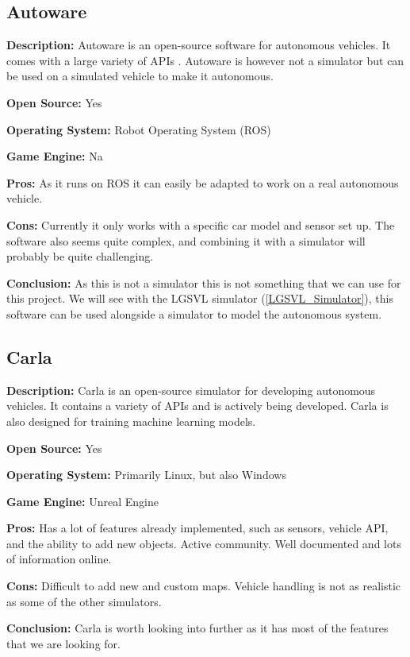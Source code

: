 \subsection{Autoware} \label{Autoware}
\textbf{Description:} Autoware is an open-source software for autonomous vehicles. It comes with a large variety of APIs  \cite{Autoware_doc_Website}. Autoware is however not a simulator but can be used on a simulated vehicle to make it autonomous.

\textbf{Open Source:} Yes

\textbf{Operating System:} Robot Operating System (ROS)

\textbf{Game Engine:} Na

\textbf{Pros:} As it runs on ROS it can easily be adapted to work on a real autonomous vehicle.

\textbf{Cons:} Currently it only works with a specific car model and sensor set up. The software also seems quite complex, and combining it with a simulator will probably be quite challenging.

\textbf{Conclusion:} As this is not a simulator this is not something that we can use for this project. We will see with the LGSVL simulator (\ref{LGSVL_Simulator}), this software can be used alongside a simulator to model the autonomous system. 


\subsection{Carla} \label{Carla}
\textbf{Description:} Carla is an open-source simulator for developing autonomous vehicles. It contains a variety of APIs and is actively being developed. Carla is also designed for training machine learning models. 

\textbf{Open Source:} Yes

\textbf{Operating System:} Primarily Linux, but also Windows

\textbf{Game Engine:} Unreal Engine

\textbf{Pros:} Has a lot of features already implemented, such as sensors, vehicle API, and the ability to add new objects. Active community. Well documented and lots of information online. 

\textbf{Cons:} Difficult to add new and custom maps. Vehicle handling is not as realistic as some of the other simulators.

\textbf{Conclusion:} Carla is worth looking into further as it has most of the features that we are looking for.


